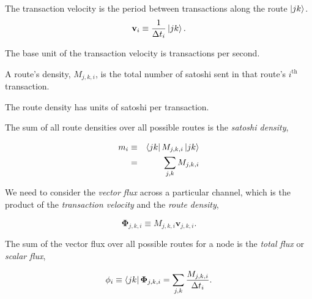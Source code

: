 \documentclass[review,12pt]{elsarticle}
\begin{document}
\begin{definition}
  The transaction velocity is the period between transactions along the route $\Ket{jk}$.
  \begin{equation}
    \mathbf{v}_i \equiv \frac{1}{\Delta t_i}\Ket{jk}. \nonumber
  \end{equation}
\end{definition}
The base unit of the transaction velocity is transactions per second.

\begin{definition} 
  A route's density, $M_{j,k,i}$, is the total number of satoshi sent in that route's $i^\textrm{th}$ transaction.
\end{definition}
The route density has units of satoshi per transaction.

The sum of all route densities over all possible routes is the \emph{satoshi density},
\begin{definition}
  \begin{eqnarray}
    m_i & \equiv & \Bra{jk} M_{j,k,i} \Ket{jk} \nonumber \\
    & = & \sum_{j,k}M_{j,k,i} \nonumber
  \end{eqnarray}
\end{definition}

We need to consider the \emph{vector flux} across a particular channel, which is the product of the \emph{transaction velocity} and the \emph{route density},
\begin{definition}
  \begin{equation}
    \mathbf{\Phi}_{j,k,i} \equiv M_{j,k,i}\mathbf{v}_{j,k,i}. \nonumber
  \end{equation}
\end{definition}

The sum of the vector flux over all possible routes for a node is the \emph{total flux} or \emph{scalar flux},
\begin{definition}
  \begin{equation}
    \phi_i \equiv \Bra{jk}\mathbf{\Phi}_{j,k,i} = \sum_{j,k} \frac{M_{j,k,i}}{\Delta t_i}. \nonumber
  \end{equation}
\end{definition}
\end{document}
